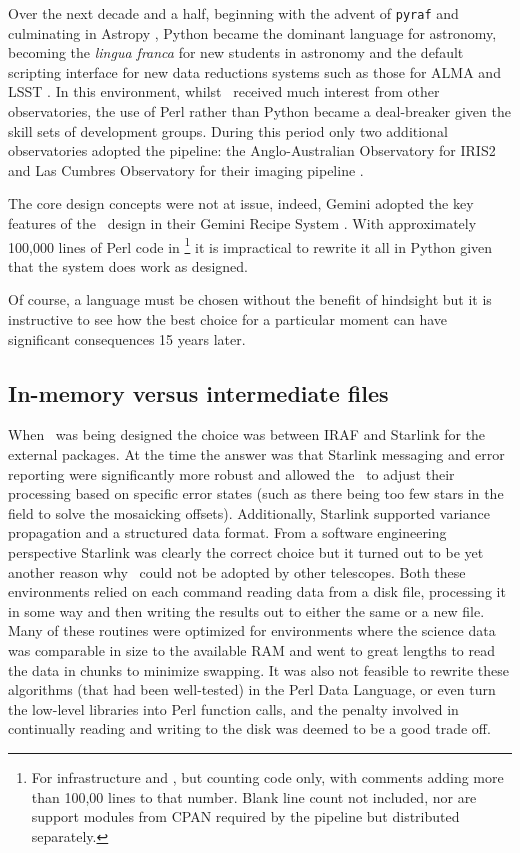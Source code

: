 \documentclass[final,authoryear,5p,times,twocolumn]{elsarticle}
\begin{document}
Over the next decade and a half, beginning with the advent of \texttt{pyraf}
\citep[][]{2000ASPC..216...59G,2006hstc.conf..437G}
and culminating in Astropy \citep{2013A&A...558A..33A},
Python became the dominant language for astronomy,
becoming the \emph{lingua franca} for new students in astronomy and
the default scripting interface for new data reductions systems such
as those for ALMA
\citep{2007ASPC..376..127M} and LSST \citep{2010SPIE.7740E..15A}.
In this environment, whilst \oracdr\ received much interest from other
observatories, the use of Perl rather than Python became a
deal-breaker given the skill sets of development groups. During this
period only two additional observatories adopted the pipeline: the
Anglo-Australian Observatory for IRIS2 \citep{2004SPIE.5492..998T} and Las Cumbres
Observatory for their imaging pipeline \citep{2013PASP..125.1031B}.

The core design concepts were not at issue, indeed, Gemini adopted the
key features of the \oracdr\ design in their Gemini Recipe System
\citep{2014ASPC..485..359L}. With approximately 100,000 lines of Perl code in
\oracdr\footnote{For infrastructure and \primitives, but counting code only, with comments adding more than
  100,00 lines to that
  number. Blank line count not included, nor are support modules from CPAN
  required by the pipeline but distributed separately.} it
is impractical to rewrite it all in Python given that the system does
work as designed.

Of course, a language must be chosen without the benefit of hindsight
but it is instructive to see how the best choice for a particular
moment can have significant consequences 15 years later.

\subsection{In-memory versus intermediate files}

When \oracdr\ was being designed the choice was between IRAF
\citep[][]{2012ASPC..461..595F} and Starlink for the
external packages.
At the time the answer was that Starlink messaging and error reporting were
significantly more robust and allowed the \primitives\ to adjust their
processing based on specific error states (such as there being too few
stars in the field to solve the mosaicking offsets). Additionally,
Starlink supported variance propagation and a structured data format.
From a software
engineering perspective Starlink was clearly the correct choice but it
turned out to be yet another reason why \oracdr\ could not be adopted
by other telescopes. Both these environments relied on each command
reading data from a disk file, processing it in some way and then
writing the results out to either the same or a new file. Many of
these routines were optimized for environments where the science data
was comparable in size to the available RAM and went to great lengths
to read the data in chunks to minimize swapping. It was also not
feasible to rewrite these algorithms (that had been well-tested) in
the Perl Data Language, or even turn the low-level libraries into Perl
function calls, and the penalty involved in continually reading
and writing to the disk was deemed to be a good trade off.
\end{document}
